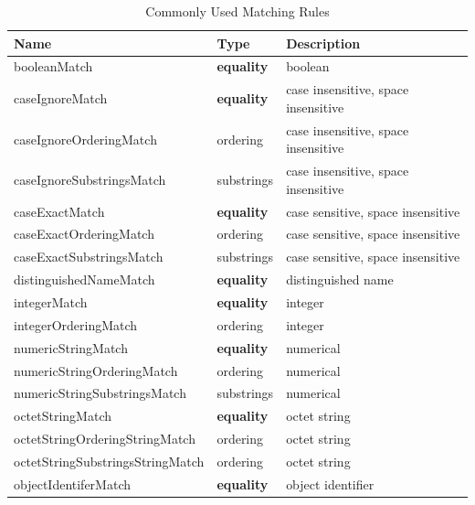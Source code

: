 \documentclass[a4paper]{report}
\begin{document}
\begin{table}[htb!]
	\centering
	\caption{Commonly Used Matching Rules}
	\begin{tabular}{|l|l|l|}
		\hline
		\textbf{Name}                    & \textbf{Type}     & \textbf{Description}                \\ \hline
		booleanMatch                     & \textbf{equality} & boolean                             \\ \hline
		caseIgnoreMatch                  & \textbf{equality} & case insensitive, space insensitive \\ \hline
		caseIgnoreOrderingMatch          & ordering          & case insensitive, space insensitive \\ \hline
		caseIgnoreSubstringsMatch        & substrings        & case insensitive, space insensitive \\ \hline
		caseExactMatch                   & \textbf{equality} & case sensitive, space insensitive   \\ \hline
		caseExactOrderingMatch           & ordering          & case sensitive, space insensitive   \\ \hline
		caseExactSubstringsMatch         & substrings        & case sensitive, space insensitive   \\ \hline
		distinguishedNameMatch           & \textbf{equality} & distinguished name                  \\ \hline
		integerMatch                     & \textbf{equality} & integer                             \\ \hline
		integerOrderingMatch             & ordering          & integer                             \\ \hline
		numericStringMatch               & \textbf{equality} & numerical                           \\ \hline
		numericStringOrderingMatch       & ordering          & numerical                           \\ \hline
		numericStringSubstringsMatch     & substrings        & numerical                           \\ \hline
		octetStringMatch                 & \textbf{equality} & octet string                        \\ \hline
		octetStringOrderingStringMatch   & ordering          & octet string                        \\ \hline
		octetStringSubstringsStringMatch & ordering          & octet string                        \\ \hline
		objectIdentiferMatch             & \textbf{equality} & object identifier                   \\ \hline
	\end{tabular}
\end{table}
\end{document}

